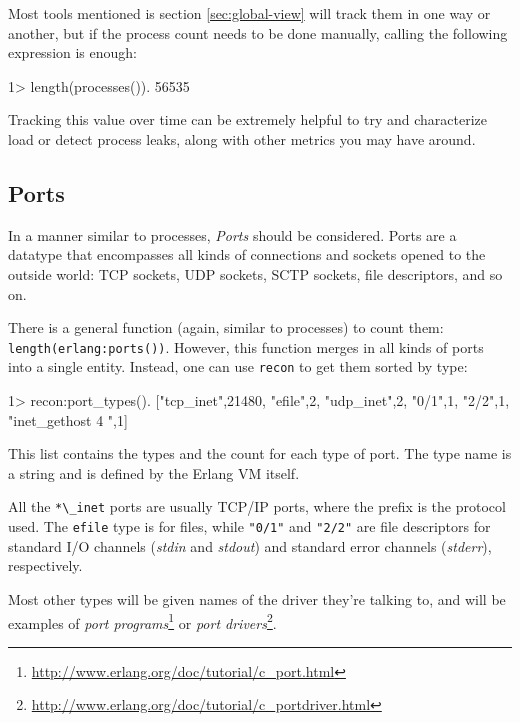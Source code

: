 \documentclass[11pt, oneside]{book}   	%
\newcommand{\otpapp}[1]{\Verb`#1`}
\newcommand{\expression}[1]{\Verb`#1`}
\begin{document}
Most tools mentioned is section \ref{sec:global-view} will track them in one way or another, but if the process count needs to be done manually, calling the following expression is enough:

\begin{VerbatimEshell}
1> length(processes()).
56535
\end{VerbatimEshell}

Tracking this value over time can be extremely helpful to try and characterize load or detect process leaks, along with other metrics you may have around.

\subsection{Ports}
\label{subsec:global-ports}

In a manner similar to processes, \emph{Ports} should be considered. Ports are a datatype that encompasses all kinds of connections and sockets opened to the outside world: TCP sockets, UDP sockets, SCTP sockets, file descriptors, and so on.

There is a general function (again, similar to processes) to count them: \expression{length(erlang:ports())}. However, this function merges in all kinds of ports into a single entity. Instead, one can use \otpapp{recon} to get them sorted by type:

\begin{VerbatimEshell}
1> recon:port_types().
[{"tcp_inet",21480},
 {"efile",2},
 {"udp_inet",2},
 {"0/1",1},
 {"2/2",1},
 {"inet_gethost 4 ",1}]
 \end{VerbatimEshell}

This list contains the types and the count for each type of port. The type name is a string and is defined by the Erlang VM itself.

All the \expression{*\_inet} ports are usually TCP/IP ports, where the prefix is the protocol used. The \expression{efile} type is for files, while \expression{"0/1"} and \expression{"2/2"} are file descriptors for standard I/O channels (\emph{stdin} and \emph{stdout}) and standard error channels (\emph{stderr}), respectively.

Most other types will be given names of the driver they're talking to, and will be examples of \emph{port programs}\footnote{\href{http://www.erlang.org/doc/tutorial/c\_port.html}{http://www.erlang.org/doc/tutorial/c\_port.html}} or \emph{port drivers}\footnote{\href{http://www.erlang.org/doc/tutorial/c\_portdriver.html}{http://www.erlang.org/doc/tutorial/c\_portdriver.html}}.
\end{document}
